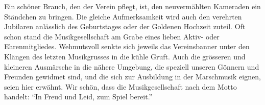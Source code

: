 \begin{multicols}{2}
    Ein schöner Brauch, den der Verein pflegt, ist, den neuvermählten Kameraden
    ein Ständchen zu bringen. Die gleiche Aufmerksamkeit wird auch den verehrten
    Jubilaren anlässlich des Geburtstages oder der Goldenen Hochzeit zuteil. Oft
    schon stand die Musikgesellschaft am Grabe eines lieben Aktiv- oder
    Ehrenmitgliedes. Wehmutsvoll senkte sich jeweils das Vereinsbanner unter den
    Klängen des letzten Musikgrusses in die kühle Gruft. Auch die grösseren und
    kleineren Ausmärsche in die nähere Umgebung, die speziell unseren Gönnern
    und Freunden gewidmet sind, und die sich zur Ausbildung in der Marschmusik
    eignen, seien hier erwähnt. Wir schön, dass die Musikgesellschaft nach dem
    Motto handelt: "`In Freud und Leid, zum Spiel bereit."'


\end{multicols}
